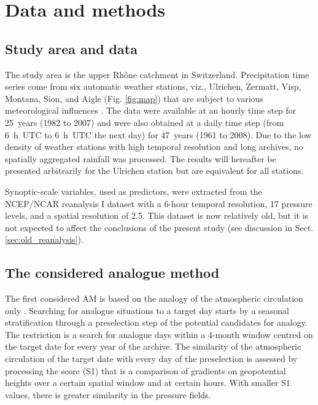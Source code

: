 \documentclass[hess, manuscript]{copernicus}
\begin{document}
	
	\section{Data and methods}
	\label{sec:data_methods}
	
	\subsection{Study area and data}
	\label{sec:data}
	
	The study area is the upper Rh\^{o}ne catchment in Switzerland. Precipitation time series come from six automatic weather stations, viz., Ulrichen, Zermatt, Visp, Montana, Sion, and Aigle (Fig. \ref{fig:map}) that are subject to various meteorological influences \citep{Horton2012}. The data were available at an hourly time step for 25~years (1982 to 2007) and were also obtained at a daily time step (from 6~h~UTC to 6~h~UTC the next day) for 47~years (1961 to 2008). Due to the low density of weather stations with high temporal resolution and long archives, no spatially aggregated rainfall was processed. The results will hereafter be presented arbitrarily for the Ulrichen station but are equivalent for all stations.
	
	Synoptic-scale variables, used as predictors, were extracted from the NCEP/NCAR reanalysis I dataset \citep{Kalnay1996} with a 6-hour temporal resolution, 17 pressure levels, and a spatial resolution of 2.5\degree. This dataset is now relatively old, but it is not expected to affect the conclusions of the present study (see discussion in Sect. \ref{sec:old_reanalysis}).
	
	
	\subsection{The considered analogue method}
	\label{sec:analog_method}
	
	The first considered AM is based on the analogy of the atmospheric circulation only \citep[Table \ref{table:method_2Z},][]{Obled2002, Bontron2005, Marty2012}. Searching for analogue situations to a target day starts by a seasonal stratification through a preselection step of the potential candidates for analogy. The restriction is a search for analogue days within a 4-month window centred on the target date for every year of the archive. The similarity of the atmospheric circulation of the target date with every day of the preselection is assessed by processing the \citet{Teweles1954} score (S1) that is a comparison of gradients on geopotential heights over a certain spatial window and at certain hours. With smaller S1 values, there is greater similarity in the pressure fields.
	
\end{document}
